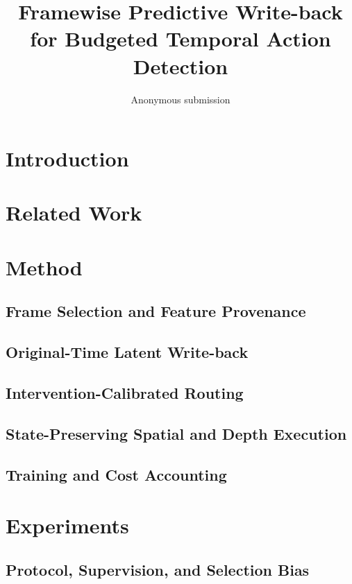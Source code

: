 \documentclass[10pt,twocolumn,letterpaper]{article}
\title{Framewise Predictive Write-back for Budgeted Temporal Action Detection}
\author{Anonymous submission}
\begin{document}
\maketitle
\begin{abstract}
\end{abstract}
\section{Introduction}
\section{Related Work}
\section{Method}
\subsection{Frame Selection and Feature Provenance}
\subsection{Original-Time Latent Write-back}
\subsection{Intervention-Calibrated Routing}
\subsection{State-Preserving Spatial and Depth Execution}
\subsection{Training and Cost Accounting}
\section{Experiments}
\subsection{Protocol, Supervision, and Selection Bias}
\end{document}
